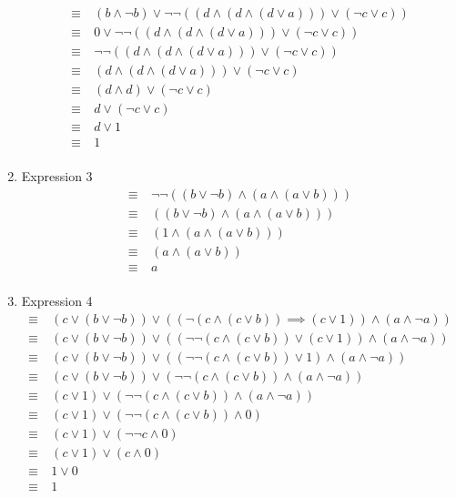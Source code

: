 \documentclass[11pt]{article}
\begin{document}
\begin{enumerate}[wide, labelindent=0pt]
\begin{align*}
        \equiv&~ (b \wedge \neg b) \vee \neg \neg ((d \wedge (d \wedge (d \vee a))) \vee (\neg c \vee c)) \\
        \equiv&~ 0 \vee \neg \neg ((d \wedge (d \wedge (d \vee a))) \vee (\neg c \vee c)) \\
        \equiv&~ \neg \neg ((d \wedge (d \wedge (d \vee a))) \vee (\neg c \vee c)) \\
        \equiv&~ (d \wedge (d \wedge (d \vee a))) \vee (\neg c \vee c) \\
        \equiv&~ (d \wedge d) \vee (\neg c \vee c) \\
        \equiv&~ d \vee (\neg c \vee c) \\
        \equiv&~ d \vee 1 \\
        \equiv&~ 1 \\
    \end{align*}
    \item Expression 3 \begin{align*}
        \equiv&~ \neg \neg ((b \vee \neg b) \wedge (a \wedge (a \vee b))) \\
        \equiv&~ ((b \vee \neg b) \wedge (a \wedge (a \vee b))) \\
        \equiv&~ (1 \wedge (a \wedge (a \vee b))) \\
        \equiv&~ (a \wedge (a \vee b)) \\
        \equiv&~ a \\
    \end{align*}
    \item Expression 4 \begin{align*}
        \equiv&~ (c \vee (b \vee \neg b)) \vee ((\neg (c \wedge (c \vee b)) \implies (c \vee 1)) \wedge (a \wedge \neg a)) \\
        \equiv&~ (c \vee (b \vee \neg b)) \vee ((\neg \neg (c \wedge (c \vee b)) \vee (c \vee 1)) \wedge (a \wedge \neg a)) \\
        \equiv&~ (c \vee (b \vee \neg b)) \vee ((\neg \neg (c \wedge (c \vee b)) \vee 1) \wedge (a \wedge \neg a)) \\
        \equiv&~ (c \vee (b \vee \neg b)) \vee (\neg \neg (c \wedge (c \vee b)) \wedge (a \wedge \neg a)) \\
        \equiv&~ (c \vee 1) \vee (\neg \neg (c \wedge (c \vee b)) \wedge (a \wedge \neg a)) \\
        \equiv&~ (c \vee 1) \vee (\neg \neg (c \wedge (c \vee b)) \wedge 0) \\
        \equiv&~ (c \vee 1) \vee (\neg \neg c \wedge 0) \\
        \equiv&~ (c \vee 1) \vee (c \wedge 0) \\
        \equiv&~ 1 \vee 0 \\
        \equiv&~ 1 \\
    \end{align*}
\end{enumerate}
\end{document}
